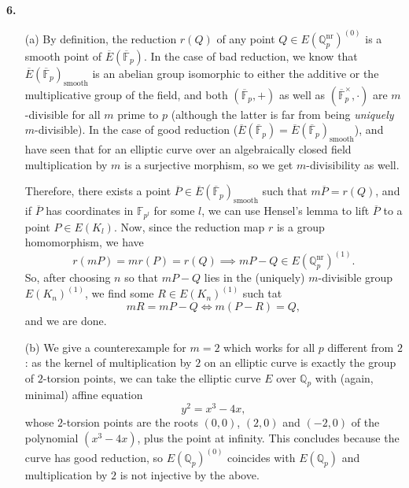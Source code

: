 \documentclass[a4paper]{article}
\newcommand{\Q}{\mathbb{Q}}
\newcommand{\Qp}{\Q_p}
\newcommand{\Fpp}{\overline{\mathbb{F}}_p}
\newcommand{\En}{E(\Qp^{\text{nr}})^{(0)}}
\theoremstyle{definition}
\theoremstyle{definition}
\theoremstyle{remark}
\theoremstyle{definition}
\begin{document}
\textbf{6. }
\begin{itemize}
    \item[(a)] By definition, the reduction $r(Q)$ of any point $Q\in\En$ is a smooth point of $\overline{E}(\Fpp)$. In the case of bad reduction, we know that $\overline{E}(\Fpp)_{\text{smooth}}$ is an abelian group isomorphic to either the additive or the multiplicative group of the field, and both $(\Fpp,+)$ as well as $(\Fpp^\times,\cdot)$ are $m$-divisible for all $m$ prime to $p$ (although the latter is far from being \textit{uniquely} $m$-divisible). In the case of good reduction ($\overline{E}(\Fpp)=\overline{E}(\Fpp)_\text{smooth}$), and have seen that for an elliptic curve over an algebraically closed field multiplication by $m$ is a surjective morphism, so we get $m$-divisibility as well.

        Therefore, there exists a point $\overline{P}\in \overline{E}(\Fpp)_{\text{smooth}}$ such that $m\overline{P}=r(Q)$, and if $\overline{P}$ has coordinates in $\mathbb{F}_{p^l}$ for some $l$, we can use Hensel's lemma to lift $\overline{P}$ to a point $P\in E(K_l)$. Now, since the reduction map $r$ is a group homomorphism, we have
        \[
            r(mP)=m r(P)=r(Q) \implies mP-Q\in E(\Qp^{\text{nr}})^{(1)}.
        \]
        So, after choosing $n$ so that $mP-Q$ lies in the (uniquely) $m$-divisible group $E(K_n)^{(1)}$, we find some $R\in E(K_n)^{(1)}$ such tat
        \[
            mR=mP-Q \iff m(P-R)=Q,
        \]
        and we are done.

    \item[(b)] We give a counterexample for $m=2$ which works for all $p$ different from
        $2$: as the kernel of multiplication by $2$ on an elliptic curve is exactly the group of $2$-torsion points, we can take the elliptic curve $E$ over $\Q_p$ with (again,
        minimal) affine equation
        \[
            y^2=x^3-4x,
        \]
        whose $2$-torsion points are the roots $(0,0)$, $(2,0)$ and $(-2,0)$ of the polynomial $(x^3-4x)$, plus the point at infinity. This concludes because the curve has good reduction, so $E(\Qp)^{(0)}$ coincides with $E(\Qp)$ and multiplication by $2$ is not injective by the above.
\end{itemize}
\end{document}
